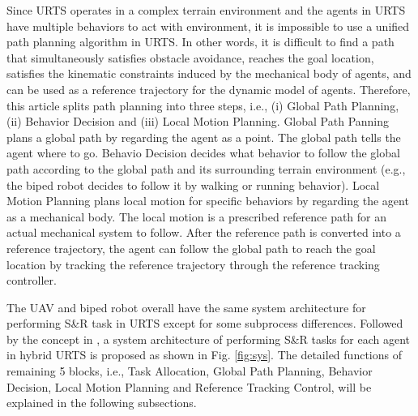\documentclass[journal,12pt,onecolumn,draftclsnofoot,]{IEEEtran}
\begin{document}
Since URTS operates in a complex terrain environment and the agents in URTS have multiple behaviors to act with environment, it is impossible to use a unified path planning algorithm in URTS. In other words, it is difficult to find a path that simultaneously satisfies obstacle avoidance, reaches the goal location, satisfies the kinematic constraints induced by the mechanical body of agents, and can be used as a reference trajectory for the dynamic model of agents. Therefore, this article splits path planning into three steps, i.e., (i) Global Path Planning, (ii) Behavior Decision and (iii) Local Motion Planning. Global Path Panning plans a global path by regarding the agent as a point. The global path tells the agent where to go. Behavio Decision decides what behavior to follow the global path according to the global path and its surrounding terrain environment (e.g., the biped robot decides to follow it by walking or running behavior). Local Motion Planning plans local motion for specific behaviors by regarding the agent as a mechanical body. 
The local motion is a prescribed reference path for an actual mechanical system to follow. After the reference path is converted into a reference trajectory, the agent can follow the global path to reach the goal location by tracking the reference trajectory through the reference tracking controller.

The UAV and biped robot overall have the same system architecture for performing S\&R task in URTS except for some subprocess differences. Followed by the concept in \cite{paden2016survey}, a system architecture of performing S\&R tasks for each agent in hybrid URTS is proposed as shown in Fig. \ref{fig:sys}. The detailed functions of remaining 5 blocks, i.e., Task Allocation, Global Path Planning, Behavior Decision, Local Motion Planning and Reference Tracking Control, will be explained in the following subsections.
\end{document}
